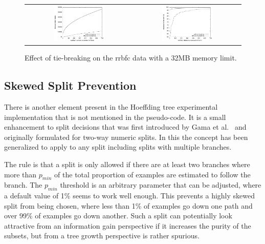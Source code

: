 \begin{figure}
\centering
\begin{tabular}{c@{}c}
\includegraphics[width=0.5\textwidth]{figures/tiebreak_rrbfc_size} &
\includegraphics[width=0.5\textwidth]{figures/tiebreak_rrbfc_acc} \\
\end{tabular}
\caption{Effect of tie-breaking on the {\sc rrbfc} data with a 32MB memory limit.}
\label{fig:tiebreak_rrbfc}
\end{figure}


\subsection{Skewed Split Prevention}
\label{sec:skewedsplits}

There is another element present in the Hoeffding tree experimental implementation that is not mentioned in the pseudo-code. It is a small enhancement to split decisions that was first introduced by Gama et al.~\cite{vfdtc} and originally formulated for two-way numeric splits. In this \thesis  the concept has been generalized to apply to any split including splits with multiple branches.

The rule is that a split is only allowed if there are at least two branches where more than $p_{min}$ of the total proportion of examples are estimated to follow the branch. The $p_{min}$ threshold is an arbitrary parameter that can be adjusted, where a default value of 1\% seems to work well enough. This prevents a highly skewed split from being chosen, where less than 1\% of examples go down one path and over 99\% of examples go down another. Such a split can potentially look attractive from an information gain perspective if it increases the purity of the subsets, but from a tree growth perspective is rather spurious.

